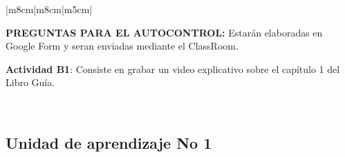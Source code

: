 \documentclass[a4paper,12pt,spanish]{article}
\begin{document}
\begin{tabular}[H]{|m{8cm}|m{8cm}|m{5cm}|}
  \begin{minipage}[H]{1.0\linewidth}
 

     \textbf{PREGUNTAS PARA EL AUTOCONTROL:} Estarán elaboradas en Google Form y seran enviadas mediante el ClassRoom.
    
      \vspace{0.5cm}
     \colorbox{green!30}{\parbox[t]{2in}{\textbf{Actividad B1}: Consiste en grabar un video
      explicativo sobre el capítulo 1 del Libro Guía.}}
      
  \end{minipage}

  \\ \hline

\end{tabular}


\newpage


\subsection{Unidad de aprendizaje No 1}
\label{sec:unid-de-aprend}
\end{document}
